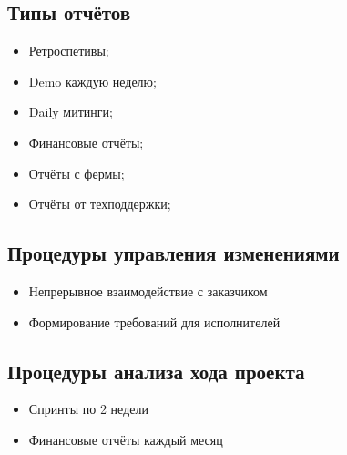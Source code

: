 \documentclass[a4paper,10pt]{article}
\begin{document}
\subsection{Типы отчётов}

    \begin{itemize}
        \item Ретроспетивы;
        \item Demo каждую неделю;
        \item Daily митинги;
        \item Финансовые отчёты;
        \item Отчёты с фермы;
        \item Отчёты от техподдержки;
    \end{itemize}


\subsection{Процедуры управления изменениями}

    \begin{itemize}
        \item Непрерывное взаимодействие с заказчиком
        \item Формирование требований для исполнителей
    \end{itemize}

\subsection{Процедуры анализа хода проекта}

    \begin{itemize}
        \item Спринты по 2 недели
        \item Финансовые отчёты каждый месяц
    \end{itemize}
\end{document}
